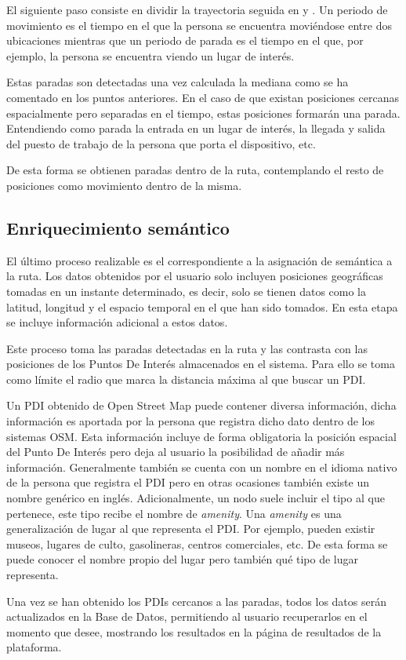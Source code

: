 El siguiente paso consiste en dividir la trayectoria seguida en  y . Un periodo de movimiento es el tiempo en el que la persona se encuentra moviéndose entre dos ubicaciones mientras que un periodo de parada es el tiempo en el que, por ejemplo, la persona se encuentra viendo un lugar de interés.

Estas paradas son detectadas una vez calculada la mediana como se ha comentado en los puntos anteriores. En el caso de que existan posiciones cercanas espacialmente pero separadas en el tiempo, estas posiciones formarán una parada. Entendiendo como parada la entrada en un lugar de interés, la llegada y salida del puesto de trabajo de la persona que porta el dispositivo, etc.

De esta forma se obtienen paradas dentro de la ruta, contemplando el resto de posiciones como movimiento dentro de la misma.

\subsection{Enriquecimiento semántico}

El último proceso realizable es el correspondiente a la asignación de semántica a la ruta. Los datos obtenidos por el usuario solo incluyen posiciones geográficas tomadas en un instante determinado, es decir, solo se tienen datos como la latitud, longitud y el espacio temporal en el que han sido tomados. En esta etapa se incluye información adicional a estos datos.

Este proceso toma las paradas detectadas en la ruta y las contrasta con las posiciones de los Puntos De Interés almacenados en el sistema. Para ello se toma como límite el radio que marca la distancia máxima al que buscar un PDI.

Un PDI obtenido de Open Street Map puede contener diversa información, dicha información es aportada por la persona que registra dicho dato dentro de los sistemas OSM. Esta información incluye de forma obligatoria la posición espacial del Punto De Interés pero deja al usuario la posibilidad de añadir más información. Generalmente también se cuenta con un nombre en el idioma nativo de la persona que registra el PDI pero en otras ocasiones también existe un nombre genérico en inglés. Adicionalmente, un nodo suele incluir el tipo al que pertenece, este tipo recibe el nombre de \textit{amenity}. Una \textit{amenity} es una generalización de lugar al que representa el PDI. Por ejemplo, pueden existir museos, lugares de culto, gasolineras, centros comerciales, etc. De esta forma se puede conocer el nombre propio del lugar pero también qué tipo de lugar representa.

Una vez se han obtenido los PDIs cercanos a las paradas, todos los datos serán actualizados en la Base de Datos, permitiendo al usuario recuperarlos en el momento  que desee, mostrando los resultados en la página de resultados de la plataforma.
